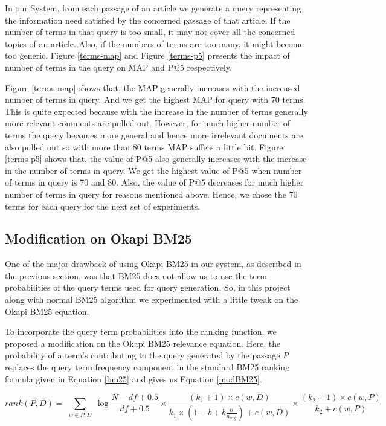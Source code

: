 \documentclass[article]{IEEEtran}
\begin{document}
In our System, from each passage of an article we generate a query representing the information need satisfied by the concerned passage of that article. If the number of terms in that query is too small, it may not cover all the concerned topics of an article. Also, if the numbers of terms are too many, it might become too generic. Figure \ref{terms-map} and Figure \ref{terms-p5} presents the impact of number of terms in the query on MAP and P@5 respectively.

Figure \ref{terms-map} shows that, the MAP generally increases with the increased number of terms in query. And we get the highest MAP for query with 70 terms. This is quite expected because with the increase in the number of terms generally more relevant comments are pulled out. However, for much higher number of terms the query becomes more general and hence more irrelevant documents are also pulled out so with more than 80 terms MAP suffers a little bit.
Figure \ref{terms-p5} shows that, the value of P@5 also generally increases with the increase in the number of terms in query. We get the highest value of P@5 when number of terms in query is 70 and 80. Also, the value of P@5 decreases for much higher number of terms in query for reasons mentioned above.  Hence, we chose the 70 terms for each query for the next set of experiments. 



\subsection{Modification on Okapi BM25}
One of the major drawback of using Okapi BM25 in our system, as described in the previous section, was that BM25 does not allow us to use the term probabilities of the query terms used for query generation. So, in this project along with normal BM25 algorithm we experimented with a little tweak on the Okapi BM25 equation. 

To incorporate the query term probabilities into the ranking function, we proposed a modification on the Okapi BM25 relevance equation. Here, the probability of a term's contributing to the query generated by the passage $P$ replaces the query term frequency component in the standard BM25 ranking formula given in Equation \ref{bm25} and gives us Equation \ref{modBM25}. 

\begin{widetext}
\begin{equation*}
\label{bm25}
rank(P,D) = \sum_{\substack{w \in P,D}}\log{\frac{N - df + 0.5}{df + 0.5}} \times 
{\frac{(k_1 + 1) \times c(w, D)}{k_1 \times (1 - b + b \frac{n}{n_{avg}}) + c(w,D)}} \times
\frac{(k_2 + 1) \times {c(w, P)}}{k_2 + c(w, P)}
\end{equation*}
\end{widetext}
\end{document}
